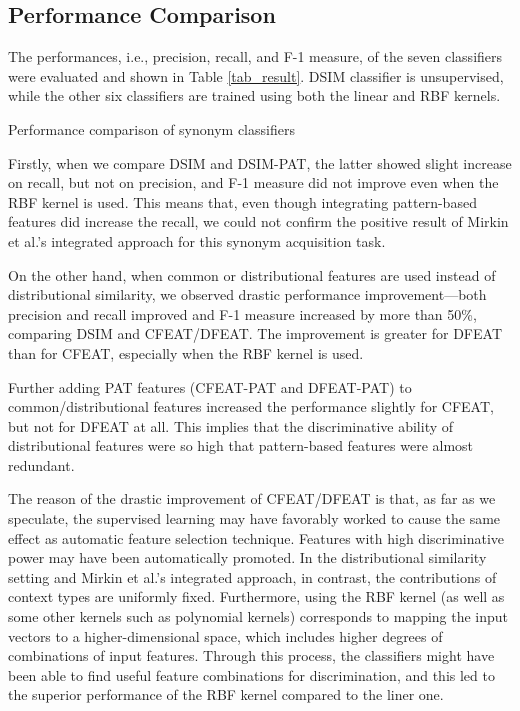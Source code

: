 \documentclass[english]{jnlp_1.4}
\begin{document}
\subsection{Performance Comparison}

The performances, i.e., precision, recall, and F-1 measure, of the
seven classifiers were evaluated and shown in Table \ref{tab_result}.
DSIM classifier is unsupervised, while the other six classifiers are
trained using both the linear and RBF kernels.

\begin{table}[b]
\caption{Performance comparison of synonym classifiers}
\label{tab_result}

\end{table}

Firstly, when we compare DSIM and DSIM-PAT, the latter showed slight
increase on recall, but not on precision, and F-1 measure did not
improve even when the RBF kernel is used. This means that, even though
integrating pattern-based features did increase the recall, we could
not confirm the positive result of Mirkin et al.'s integrated approach
\cite{Mirkin:06} for this synonym acquisition task.


On the other hand, when common or distributional features are used
instead of distributional similarity, we observed drastic performance
improvement---both precision and recall improved and F-1 measure
increased by more than 50\%, comparing DSIM and CFEAT/DFEAT. The
improvement is greater for DFEAT than for CFEAT, especially when the
RBF kernel is used.


Further adding PAT features (CFEAT-PAT and DFEAT-PAT) to
common/distributional features increased the performance slightly for
CFEAT, but not for DFEAT at all. This implies that the discriminative
ability of distributional features were so high that pattern-based
features were almost redundant.




The reason of the drastic improvement of CFEAT/DFEAT is that, as far
as we speculate, the supervised learning may have favorably worked to
cause the same effect as automatic feature selection
technique. Features with high discriminative power may have been
automatically promoted. In the distributional similarity setting and
Mirkin et al.'s integrated approach, in contrast, the contributions of
context types are uniformly fixed. Furthermore, using the RBF kernel
(as well as some other kernels such as polynomial kernels) corresponds
to mapping the input vectors to a higher-dimensional space, which
includes higher degrees of combinations of input features. Through
this process, the classifiers might have been able to find useful
feature combinations for discrimination, and this led to the superior
performance of the RBF kernel compared to the liner one.
\end{document}
